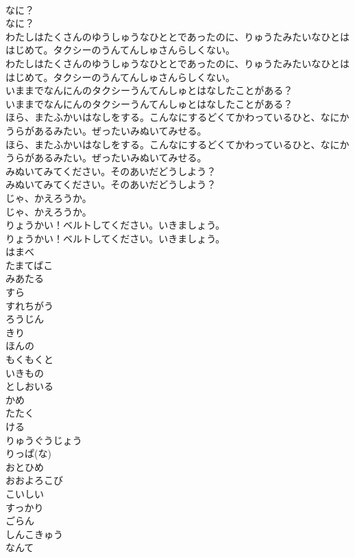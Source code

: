 \documentclass[8pt]{extreport}
\begin{document}
\begin{CJK}{UTF8}{min}
\\	なに？	
\\	なに？ 
\\	わたしはたくさんのゆうしゅうなひととであったのに、りゅうたみたいなひとははじめて。タクシーのうんてんしゅさんらしくない。	
\\	わたしはたくさんのゆうしゅうなひととであったのに、りゅうたみたいなひとははじめて。タクシーのうんてんしゅさんらしくない。 
\\	いままでなんにんのタクシーうんてんしゅとはなしたことがある？	
\\	いままでなんにんのタクシーうんてんしゅとはなしたことがある？ 
\\	ほら、またふかいはなしをする。こんなにするどくてかわっているひと、なにかうらがあるみたい。ぜったいみぬいてみせる。	
\\	ほら、またふかいはなしをする。こんなにするどくてかわっているひと、なにかうらがあるみたい。ぜったいみぬいてみせる。 
\\	みぬいてみてください。そのあいだどうしよう？	
\\	みぬいてみてください。そのあいだどうしよう？ 
\\	じゃ、かえろうか。	
\\	じゃ、かえろうか。 
\\	りょうかい！ベルトしてください。いきましょう。	
\\	りょうかい！ベルトしてください。いきましょう。 
\\	はまべ
\\	たまてばこ
\\	みあたる
\\	すら
\\	すれちがう
\\	ろうじん
\\	きり
\\	ほんの
\\	もくもくと
\\	いきもの
\\	としおいる
\\	かめ
\\	たたく
\\	ける
\\	りゅうぐうじょう
\\	りっぱ(な)
\\	おとひめ
\\	おおよろこび
\\	こいしい
\\	すっかり
\\	ごらん
\\	しんこきゅう
\\	なんて

\end{CJK}
\end{document}

